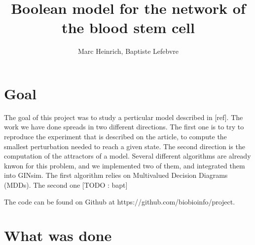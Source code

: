 \documentclass[a4paper,11pt]{article}
\author{Marc Heinrich, Baptiste Lefebvre}
\title{Boolean model for the network of the blood stem cell}
\begin{document}
\maketitle

\section{Goal}



The goal of this project was to study a perticular model described in [ref]. %
The work we have done spreads in two different directions. The first one is to try to reproduce the experiment that is described on the article, to compute the smallest perturbation needed to reach a given state. 
The second direction is the computation of the attractors of a model. Several different algorithms are already knwon for this problem, and we implemented two of them, and integrated them into GINsim. The first algorithm relies on Multivalued Decision Diagrams (MDDs). The second one [TODO : bapt]


The code can be found on Github at https://github.com/biobioinfo/project.

\section{What was done}




\end{document}
